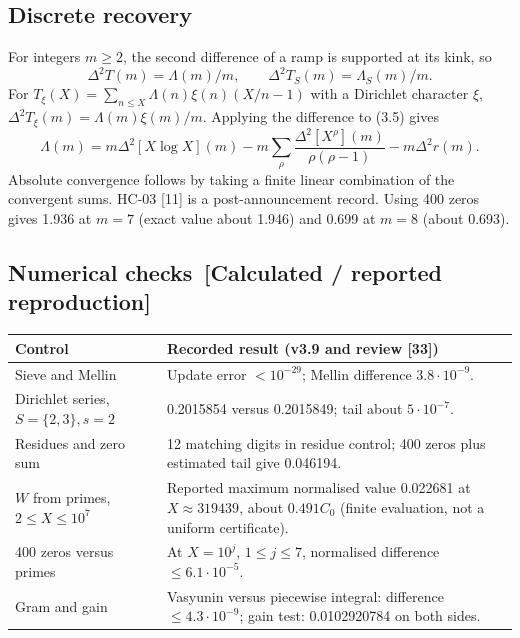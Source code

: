 \documentclass[11pt,a4paper]{article}
\newcommand{\estatuto}[1]{{\normalfont\small\color{tag}\,[#1]}}
\newenvironment{tabla}{\par\smallskip\small}{\par\smallskip}
\begin{document}
\subsection{Discrete recovery}
For integers $m\ge2$, the second difference of a ramp is supported at its kink, so
\[\Delta^2T(m)=\Lambda(m)/m,\qquad \Delta^2T_S(m)=\Lambda_S(m)/m.\]
For $T_\xi(X)=\sum_{n\le X}\Lambda(n)\xi(n)(X/n-1)$ with a Dirichlet character $\xi$, $\Delta^2T_\xi(m)=\Lambda(m)\xi(m)/m$. Applying the difference to (3.5) gives
\[\Lambda(m)=m\Delta^2[X\log X](m)-m\sum_\rho\frac{\Delta^2[X^\rho](m)}{\rho(\rho-1)}-m\Delta^2r(m).\]
Absolute convergence follows by taking a finite linear combination of the convergent sums. HC-03 [11] is a post-announcement record. Using 400 zeros gives 1.936 at $m=7$ (exact value about 1.946) and 0.699 at $m=8$ (about 0.693).
\subsection{Numerical checks \estatuto{Calculated / reported reproduction}}
\begin{tabla}\begin{xltabular}{\linewidth}{@{}P{4.1cm}L@{}}\toprule
Control & Recorded result (v3.9 and review [33])\\\midrule\endhead
Sieve and Mellin & Update error $<10^{-29}$; Mellin difference $3.8\cdot10^{-9}$.\\
Dirichlet series, $S=\{2,3\},s=2$ & 0.2015854 versus 0.2015849; tail about $5\cdot10^{-7}$.\\
Residues and zero sum & 12 matching digits in residue control; 400 zeros plus estimated tail give 0.046194.\\
$W$ from primes, $2\le X\le10^7$ & Reported maximum normalised value 0.022681 at $X\approx319439$, about $0.491 C_0$ (finite evaluation, not a uniform certificate).\\
400 zeros versus primes & At $X=10^j$, $1\le j\le7$, normalised difference $\le6.1\cdot10^{-5}$.\\
Gram and gain & Vasyunin versus piecewise integral: difference $\le4.3\cdot10^{-9}$; gain test: 0.0102920784 on both sides.\\\bottomrule\end{xltabular}\end{tabla}
\end{document}
